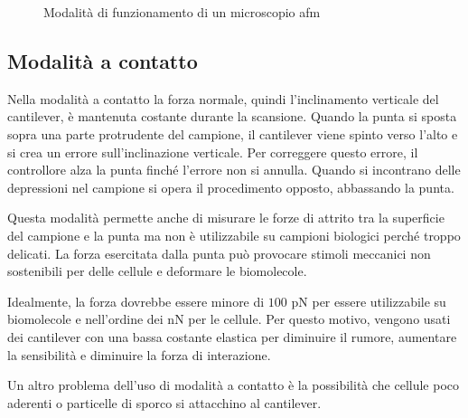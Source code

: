 \documentclass[../main.tex]{subfiles}
\begin{document}
\begin{figure}[h]
\begin{subfigure}{0.32\linewidth}
\end{subfigure}
\caption[Modalità di funzionamento di un microscopio AFM]{
	Modalità di funzionamento di un microscopio \acrshort{afm}}
\label{fig:afm_modes}
\end{figure}

\subsection{Modalità a contatto} \label{s:afm_c}

Nella modalità a contatto la forza normale, quindi l'inclinamento verticale del cantilever, è mantenuta costante durante la scansione. Quando la punta si sposta sopra una parte protrudente del campione, il cantilever viene spinto verso l'alto e si crea un errore sull'inclinazione verticale. Per correggere questo errore, il controllore alza la punta finché l'errore non si annulla. Quando si incontrano delle depressioni nel campione si opera il procedimento opposto, abbassando la punta.

Questa modalità permette anche di misurare le forze di attrito tra la superficie del campione e la punta ma non è utilizzabile su campioni biologici perché troppo delicati. La forza esercitata dalla punta può provocare stimoli meccanici non sostenibili per delle cellule e deformare le biomolecole.\cite{zhong_1993}

Idealmente, la forza dovrebbe essere minore di $100$ pN per essere utilizzabile su biomolecole e nell'ordine dei nN per le cellule. Per questo motivo, vengono usati dei cantilever con una bassa costante elastica per diminuire il rumore, aumentare la sensibilità e diminuire la forza di interazione.\cite{wang_2018}

Un altro problema dell'uso di modalità a contatto è la possibilità che cellule poco aderenti o particelle di sporco si attacchino al cantilever.
\end{document}
